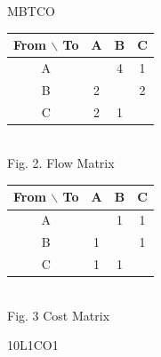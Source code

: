 \documentclass{rvcepaper}
\begin{document}
\begin{iempaper}
\begin{cietable}{M}{BT}{CO}
{\begin{minipage}[c]{4.6cm}\centering\renewcommand{\arraystretch}{1.25}\begin{tabular}{|c|c|c|c|}\hline From $\backslash$ To & A & B & C\\\hline A & & 4 & 1\\\hline B & 2 & & 2\\\hline C & 2 & 1 & \\\hline\end{tabular}\\[6pt]{\small Fig. 2. Flow Matrix}\end{minipage}\hspace{0.3cm}%
\begin{minipage}[c]{4.6cm}\centering\renewcommand{\arraystretch}{1.25}\begin{tabular}{|c|c|c|c|}\hline From $\backslash$ To & A & B & C\\\hline A & & 1 & 1\\\hline B & 1 & & 1\\\hline C & 1 & 1 & \\\hline\end{tabular}\\[6pt]{\small Fig. 3 Cost Matrix}\end{minipage}}{10}{L1}{CO1}
\end{cietable}
\stars{*****}
\end{iempaper}
\end{document}

